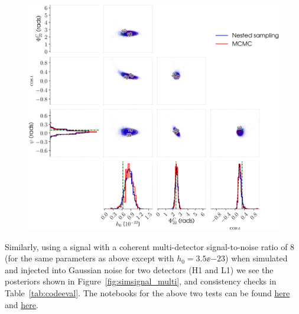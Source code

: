 \begin{figure}[!phtb]
\begin{center}
\includegraphics[width=1\columnwidth]{./figures/codeeval/simulations/signal/simulatedsignaltest}
\caption{ \protect}
\end{center}
\end{figure}

Similarly, using a signal with a coherent multi-detector signal-to-noise ratio of 8 (for the same parameters as above except with $h_0 = 3.5\ee{-23}$) when
simulated and injected into Gaussian noise for two detectors (H1
and L1) we see the posteriors shown in Figure~\ref{fig:simsignal_multi}, and consistency checks in Table~\ref{tab:codeeval}. The notebooks for the above two tests
can be found \href{https://github.com/mattpitkin/CW_nested_sampling_doc/blob/master/figures/codeeval/simulations/signal/SimulatedSignalTestsPaper.ipynb}{here} and 
\href{https://github.com/mattpitkin/CW_nested_sampling_doc/blob/master/figures/codeeval/simulations/signal_multidet/SimulatedSignalMultidetTestsPaper.ipynb}{here}.

